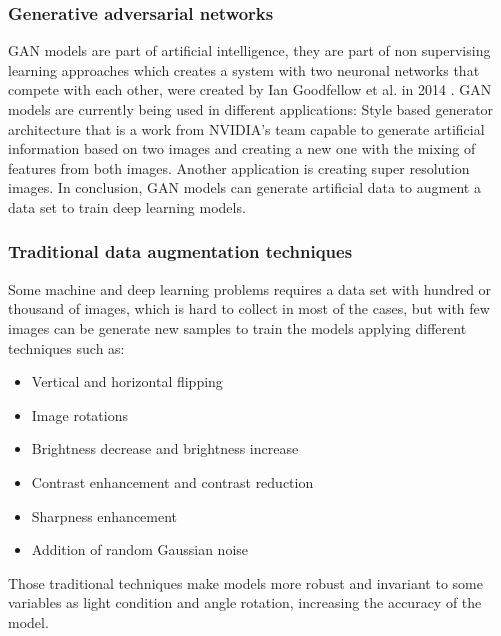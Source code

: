 \subsubsection{Generative adversarial networks}

GAN models are part of artificial intelligence, they are part of non supervising learning approaches which creates a system with two neuronal networks that compete with each other, were created by Ian Goodfellow et al. in 2014 \cite{NIPS2014_5423}. GAN models are currently being used in different applications: Style based generator architecture \cite{DBLP} that is a work from NVIDIA's team capable to generate artificial information based on two images and creating a new one with the mixing of features from both  images. Another  application is creating super resolution images\cite{DBLP1}. In conclusion, GAN models can generate artificial data to augment a data set to train deep learning models.

\subsubsection{Traditional data augmentation techniques}
Some machine and deep learning problems requires a data set with hundred or thousand of images, which is hard to collect in most of the cases, but with few images can be generate new samples to train the models applying different techniques\cite{barbedo2018impact} such as:
\begin{itemize} 
\item Vertical and horizontal flipping  
\item Image rotations
\item Brightness decrease and brightness increase
\item Contrast enhancement and contrast reduction
\item Sharpness enhancement
\item Addition of random Gaussian noise
\end{itemize}   

Those traditional techniques make models more robust and invariant to some variables as light condition and angle rotation, increasing the accuracy of the model.